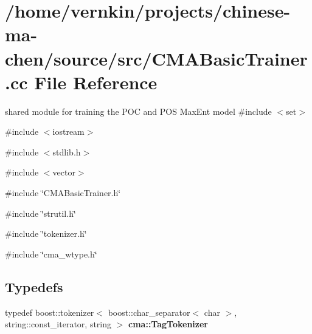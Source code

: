 \section{/home/vernkin/projects/chinese-\/ma-\/chen/source/src/CMABasicTrainer.cc File Reference}
\label{CMABasicTrainer_8cc}


shared module for training the POC and POS MaxEnt model  
{\ttfamily \#include $<$set$>$}\par
{\ttfamily \#include $<$iostream$>$}\par
{\ttfamily \#include $<$stdlib.h$>$}\par
{\ttfamily \#include $<$vector$>$}\par
{\ttfamily \#include \char`\"{}CMABasicTrainer.h\char`\"{}}\par
{\ttfamily \#include \char`\"{}strutil.h\char`\"{}}\par
{\ttfamily \#include \char`\"{}tokenizer.h\char`\"{}}\par
{\ttfamily \#include \char`\"{}cma\_\-wtype.h\char`\"{}}\par
\subsection*{Typedefs}
\begin{DoxyCompactItemize}
\item 
typedef boost::tokenizer$<$ boost::char\_\-separator$<$ char $>$, string::const\_\-iterator, string $>$ {\bfseries cma::TagTokenizer}\label{namespacecma_aa0c6c2dc82197fc6600c20a59cade565}

\end{DoxyCompactItemize}
